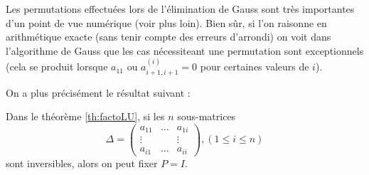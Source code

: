 \vspace{0.7cm}
Les permutations effectuées lors de l'élimination de Gauss sont très importantes d'un point de vue numérique (voir plus loin).
Bien sûr, si l'on raisonne en arithmétique exacte (sans tenir compte des erreurs d'arrondi)
on voit dans l'algorithme de Gauss que les cas nécessiteant une permutation sont
exceptionnels (cela se produit lorsque $a_{11}$ ou $a^{(i)}_{i+1,i+1}=0$ pour certaines valeurs de $i$).

On a plus précisément le résultat suivant :

\begin{ftheo}
    Dans le théorème \ref{th:factoLU}, si les $n$ sous-matrices
    \[\Delta = \begin{pmatrix}
        a_{11} & \dots & a_{1i} \\
        \vdots & & \vdots \\
        a_{i1} & \dots & a_{ii}
    \end{pmatrix}
, (1 \leq i \leq n)\]
    sont inversibles, alors on peut fixer $P = I$.
\end{ftheo}

